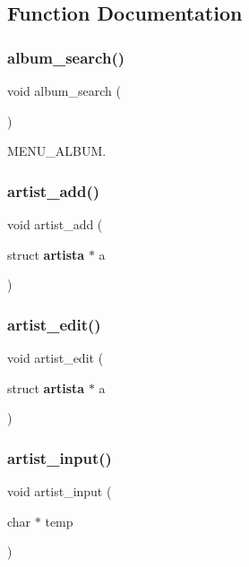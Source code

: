 \subsection{Function Documentation}
\mbox{\label{project_8h_a8e05ef4493750f4348b12f44571a0cb4}} 
\subsubsection{album\_search()}
{\footnotesize\ttfamily void album\+\_\+search (\begin{DoxyParamCaption}{ }\end{DoxyParamCaption})}



M\+E\+N\+U\+\_\+\+A\+L\+B\+UM. 

\mbox{\label{project_8h_aa0cc094bdfe1f29db5fe4c4405b2ddde}} 
\subsubsection{artist\_add()}
{\footnotesize\ttfamily void artist\+\_\+add (\begin{DoxyParamCaption}\item[{struct \textbf{ artista} $\ast$}]{a }\end{DoxyParamCaption})}

\mbox{\label{project_8h_ab41a14f04e6032035587c9c22e60271a}} 
\subsubsection{artist\_edit()}
{\footnotesize\ttfamily void artist\+\_\+edit (\begin{DoxyParamCaption}\item[{struct \textbf{ artista} $\ast$}]{a }\end{DoxyParamCaption})}

\mbox{\label{project_8h_a30a0e556624bca6a1523351a151cf84c}} 
\subsubsection{artist\_input()}
{\footnotesize\ttfamily void artist\+\_\+input (\begin{DoxyParamCaption}\item[{char $\ast$}]{temp }\end{DoxyParamCaption})}

